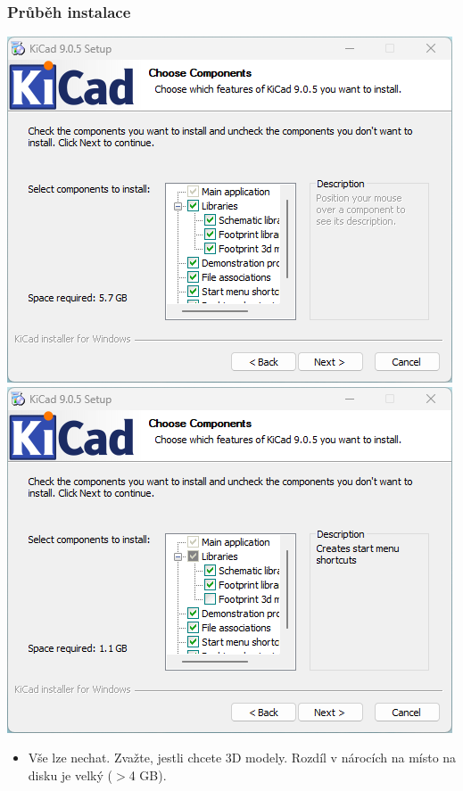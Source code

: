 \documentclass{beamer}
\begin{document}
	\begin{frame}
    \frametitle{Průběh instalace}
		\begin{center}
			\includegraphics[scale=0.5]{obr/kicad_inst3.png}
			\includegraphics[scale=0.4]{obr/kicad_inst3_no3D.png}
		\end{center}
		
		\begin{itemize}
			\item Vše lze nechat. Zvažte, jestli chcete 3D modely. Rozdíl v nárocích na místo na disku je velký ($>$4 GB).
		\end{itemize}
	\end{frame}
\end{document}
